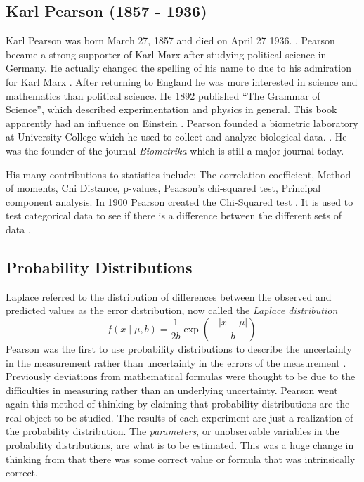 \documentclass{article}
\begin{document}
\subsection{Karl Pearson (1857 - 1936)}
Karl Pearson was born March 27, 1857 and died on April 27 1936. \cite{wiki:pearson}.
Pearson became a strong supporter of Karl Marx after studying political science in Germany.
He actually changed the spelling of his name to due to his admiration for Karl Marx \cite{salsburg_2002}.
After returning to England he was more interested in science and mathematics than political science.
He 1892 published ``The Grammar of Science'', which described experimentation and physics in general. This book apparently had an influence on Einstein \cite{wiki:grammar_science}.
Pearson founded a biometric laboratory at University College which he used to collect and analyze biological data. \cite{britannica_pearson}.
He was the founder of the journal \textit{Biometrika} which is still a major journal today.

His many contributions to statistics include: The correlation coefficient, Method of moments, Chi Distance, p-values, Pearson's chi-squared test, Principal component analysis.
In 1900 Pearson created the Chi-Squared test \cite{orig_pearson_chi}.
It is used to test categorical data to see if there is a difference between the different sets of data \cite{wiki:chi_squared}.

\subsection{Probability Distributions}
% 
Laplace referred to the distribution of differences between the observed and predicted values as the error distribution, now called the \textit{Laplace distribution} \cite{wiki:laplace_dist}
$$
f(x\mid \mu ,b)={\frac  {1}{2b}}\exp \left(-{\frac  {|x-\mu |}{b}}\right)\,\!
$$
Pearson was the first to use probability distributions to describe the uncertainty in the measurement rather than uncertainty in the errors of the measurement \cite{salsburg_2002}.
Previously deviations from mathematical formulas were thought to be due to the difficulties in measuring rather than an underlying uncertainty.
Pearson went again this method of thinking by claiming that probability distributions are the real object to be studied.
The results of each experiment are just a realization of the probability distribution.
The \textit{parameters}, or unobservable variables in the probability distributions, are what is to be estimated.
This was a huge change in thinking from that there was some correct value or formula that was intrinsically correct.
\end{document}
